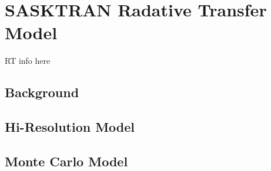 \section{SASKTRAN Radative Transfer Model}

RT info here

\subsection{Background}
\subsection{Hi-Resolution Model}
\subsection{Monte Carlo Model}
